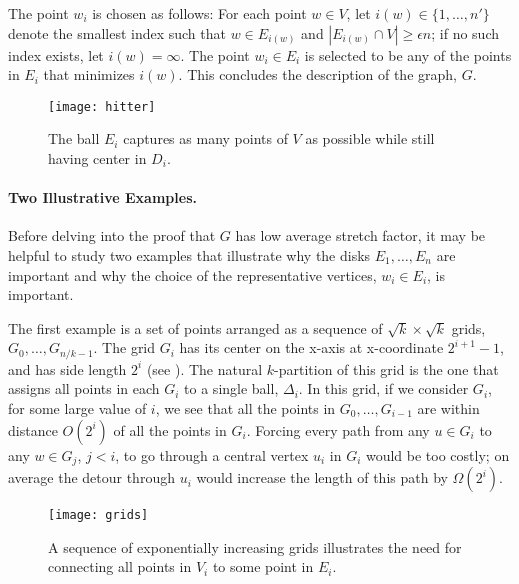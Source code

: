 \documentclass{patmorin}
\begin{document}
The point $w_i$ is chosen as follows: For each point $w\in V$, let
$i(w)\in \{1,\ldots,n'\}$ denote the smallest index such that $w\in
E_{i(w)}$ and $|E_{i(w)}\cap V| \ge \epsilon n$; if no such index
exists, let $i(w)=\infty$.  The point $w_i\in E_i$ is selected to be
any of the points in $E_i$ that minimizes $i(w)$.  This concludes the
description of the graph, $G$.  


\begin{figure}
  \begin{center}
    \texttt{[image: hitter]}
  \end{center}
  \caption{The ball $E_i$ captures as many points of $V$ as possible
   while still having center in $D_i$.}
\end{figure}

\paragraph{Two Illustrative Examples.}

Before delving into the proof that $G$ has low average stretch factor,
it may be helpful to study two examples that illustrate why the disks
$E_1,\ldots,E_n$ are important and why the choice of the representative
vertices, $w_i\in E_i$, is  important.

The first example is a set of points arranged as a sequence of
$\sqrt{k}\times\sqrt{k}$ grids, $G_0,\ldots,G_{n/k-1}$.  The grid $G_i$
has its center on the x-axis at x-coordinate $2^{i+1}-1$, and has side
length $2^i$ (see ). The natural $k$-partition of this
grid is the one that assigns all points in each $G_i$ to a single ball,
$\Delta_i$.  In this grid, if we consider $G_i$, for some large value
of $i$, we see that all the points in $G_0,\ldots,G_{i-1}$ are within
distance $O(2^{i})$ of all the points in $G_i$.
Forcing every path from any $u\in G_i$ to any $w\in G_{j}$, $j<i$,
to go through a central vertex $u_i$ in $G_i$ would be too costly; on
average the detour through $u_i$ would increase the length of this path
by $\Omega(2^{i})$.

\begin{figure}
  \begin{center}
    \texttt{[image: grids]}
  \end{center}
  \caption{A sequence of exponentially increasing grids illustrates the
   need for connecting all points in $V_i$ to some point in $E_i$.}
\end{figure}
\end{document}
